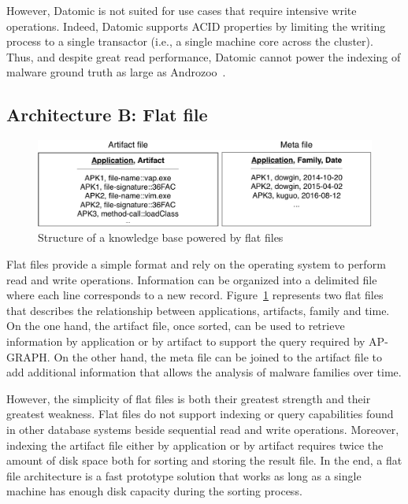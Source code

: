 However, Datomic is not suited for use cases that require intensive write operations.
Indeed, Datomic supports ACID properties by limiting the writing process to a single transactor (i.e., a single machine core across the cluster).
Thus, and despite great read performance, Datomic cannot power the indexing of malware ground truth as large as Androzoo~\cite{allix_androzoo:_2016}.
\subsection{Architecture B: Flat file}

\begin{figure}[!ht]
        \centering
	\includegraphics[width=\linewidth]{figures/apgraph/architectures/flat.pdf}
	\caption{Structure of a knowledge base powered by flat files}
	\label{figure:apgraph:architectures:flat}
\end{figure}

Flat files provide a simple format and rely on the operating system to perform read and write operations.
Information can be organized into a delimited file where each line corresponds to a new record.
Figure~\ref{figure:apgraph:architectures:flat} represents two flat files that describes the relationship between applications, artifacts, family and time.
On the one hand, the artifact file, once sorted, can be used to retrieve information by application or by artifact to support the query required by AP-GRAPH.
On the other hand, the meta file can be joined to the artifact file to add additional information that allows the analysis of malware families over time.

However, the simplicity of flat files is both their greatest strength and their greatest weakness.
Flat files do not support indexing or query capabilities found in other database systems beside sequential read and write operations.
Moreover, indexing the artifact file either by application or by artifact requires twice the amount of disk space both for sorting and storing the result file.
In the end, a flat file architecture is a fast prototype solution that works as long as a single machine has enough disk capacity during the sorting process.
